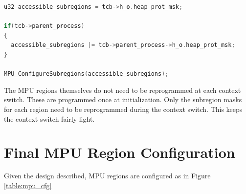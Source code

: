 \begin{lstlisting}[language=c, caption={Pseudo-code demonstrating how subregions are made accessible based on the TCB \textit{and} PCB.}, captionpos=b, label={lst:subregions}, float]
u32 accessible_subregions = tcb->h_o.heap_prot_msk;

if(tcb->parent_process)
{
  accessible_subregions |= tcb->parent_process->h_o.heap_prot_msk;
}

MPU_ConfigureSubregions(accessible_subregions);

\end{lstlisting}

The MPU regions themselves do not need to be reprogrammed at each context switch. These are programmed once at initialization. Only the subregion masks for each region need to be reprogrammed during the context switch. This keeps the context switch fairly light.

\section{Final MPU Region Configuration}

Given the design described, MPU regions are configured as in Figure \ref{table:mpu_cfg}



